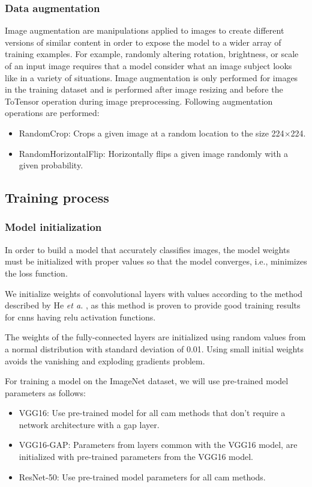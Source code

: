 \subsubsection{Data augmentation} \label{sec:training_augmentation}
Image augmentation are manipulations applied to images to create different versions of similar content in order to expose the model to a wider array of training examples. For example, randomly altering rotation, brightness, or scale of an input image requires that a model consider what an image subject looks like in a variety of situations. Image augmentation is only performed for images in the training dataset and is performed after image resizing and before the ToTensor operation during image preprocessing. Following augmentation operations are performed:
\begin{itemize}
    \item RandomCrop: Crops a given image at a random location to the size 224$\times$224.
    \item RandomHorizontalFlip: Horizontally flips a given image randomly with a given probability.
\end{itemize}

\subsection{Training process}
\subsubsection{Model initialization}
In order to build a model that accurately classifies images, the model weights must be initialized with proper values so that the model converges, i.e., minimizes the loss function.

We initialize weights of convolutional layers with values according to the method described by He \textit{et a.} \cite{he2015delving}, as this method is proven to provide good training results for \acrshort{cnn}s having \acrshort{relu} activation functions.

The weights of the fully-connected layers are initialized using random values from a normal distribution with standard deviation of 0.01. Using small initial weights avoids the vanishing and exploding gradients problem.

For training a model on the ImageNet dataset, we will use pre-trained model parameters as follows:
\begin{itemize}
    \item VGG16: Use pre-trained model for all \acrshort{cam} methods that don't require a network architecture with a \acrshort{gap} layer.
    \item VGG16-GAP: Parameters from layers common with the VGG16 model, are initialized with pre-trained parameters from the VGG16 model.
    \item ResNet-50: Use pre-trained model parameters for all \acrshort{cam} methods.
\end{itemize}

